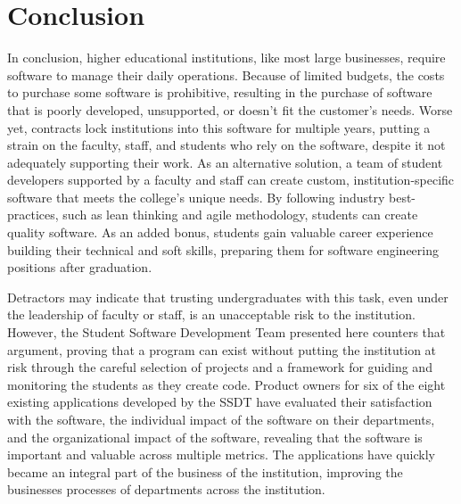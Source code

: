 \section{Conclusion}
In conclusion, higher educational institutions, like most large businesses, require software to manage their daily operations. Because of limited budgets, the costs to purchase some software is prohibitive, resulting in the purchase of software that is poorly developed, unsupported, or doesn't fit the customer's needs. Worse yet, contracts lock institutions into this software for multiple years, putting a strain on the faculty, staff, and students who rely on the software, despite it not adequately supporting their work. As an alternative solution, a team of student developers supported by a faculty and staff can create custom, institution-specific software that meets the college's unique needs. By following industry best-practices, such as lean thinking and agile methodology, students can create quality software. As an added bonus, students gain valuable career experience building their technical and soft skills, preparing them for software engineering positions after graduation. 

Detractors may indicate that trusting undergraduates with this task, even under the leadership of faculty or staff, is an unacceptable risk to the institution. However, the Student Software Development Team presented here counters that argument, proving that a program can exist without putting the institution at risk through the careful selection of projects and a framework for guiding and monitoring the students as they create code. Product owners for six of the eight existing applications developed by the SSDT have evaluated their satisfaction with the software, the individual impact of the software on their departments, and the organizational impact of the software, revealing that the software is important and valuable across multiple metrics. The applications have quickly became an integral part of the business of the institution, improving the businesses processes of departments across the institution.